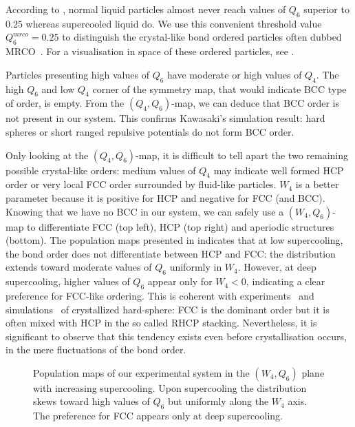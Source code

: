 According to , normal liquid particles almost never reach values of $Q_6$ superior to $0.25$ whereas supercooled liquid do. We use this convenient threshold value $Q_6^{mrco} = 0.25$ to distinguish the crystal-like bond ordered particles often dubbed \acf{MRCO}~\citep{Shintani2006, tanaka2010critical}. For a visualisation in space of these ordered particles, see .

Particles presenting high values of $Q_6$ have moderate or high values of $Q_4$. The high $Q_6$ and low $Q_4$ corner of the symmetry map, that would indicate \ac{BCC} type of order, is empty. From the $(Q_4, Q_6)$-map, we can deduce that \ac{BCC} order is not present in our system. This confirms Kawasaki's simulation result: hard spheres or short ranged repulsive potentials do not form \ac{BCC} order.

Only looking at the $(Q_4, Q_6)$-map, it is difficult to tell apart the two remaining possible crystal-like orders: medium values of $Q_4$ may indicate well formed \ac{HCP} order or very local \ac{FCC} order surrounded by fluid-like particles. $W_4$ is a better parameter because it is positive for \ac{HCP} and negative for \ac{FCC} (and \ac{BCC}). Knowing that we have no \ac{BCC} in our system, we can safely use a $(W_4, Q_6)$-map to differentiate \ac{FCC} (top left), \ac{HCP} (top right) and aperiodic structures (bottom). The population maps presented in  indicates that at low supercooling, the bond order does not differentiate between \ac{HCP} and \ac{FCC}: the distribution extends toward moderate values of $Q_6$ uniformly in $W_4$. However, at deep supercooling, higher values of $Q_6$ appear only for $W_4<0$, indicating a clear preference for \ac{FCC}-like ordering. This is coherent with experiments~\citep{Gasser2001a} and simulations~\citep{Volkov2002} of crystallized hard-sphere: \ac{FCC} is the dominant order but it is often mixed with \ac{HCP} in the so called \ac{RHCP} stacking. Nevertheless, it is significant to observe that this tendency exists even before crystallisation occurs, in the mere fluctuations of the bond order.

\begin{figure}
	\centering
	\def\svgwidth{\textwidth}
	
	\caption{Population maps of our experimental system in the $(W_4, Q_6)$ plane with increasing supercooling. Upon supercooling the distribution skews toward high values of $Q_6$ but uniformly along the $W_4$ axis. The preference for \acs{FCC} appears only at deep supercooling.}
	\label{fig:sc_W4Q6}
\end{figure}

